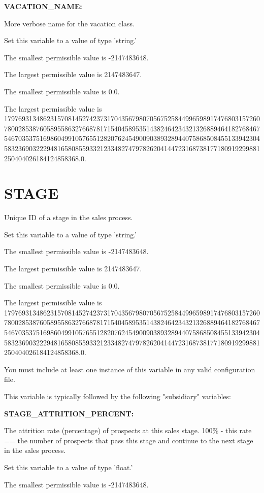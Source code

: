 \textbf{VACATION\_NAME:}


More verbose name for the vacation class.

Set this variable to a value of type 'string.'

The smallest permissible value is -2147483648.

The largest permissible value is 2147483647.

The smallest permissible value is 0.0.

The largest permissible value is 179769313486231570814527423731704356798070567525844996598917476803157260780028538760589558632766878171540458953514382464234321326889464182768467546703537516986049910576551282076245490090389328944075868508455133942304583236903222948165808559332123348274797826204144723168738177180919299881250404026184124858368.0.


\section{STAGE}


Unique ID of a stage in the sales process.

Set this variable to a value of type 'string.'

The smallest permissible value is -2147483648.

The largest permissible value is 2147483647.

The smallest permissible value is 0.0.

The largest permissible value is 179769313486231570814527423731704356798070567525844996598917476803157260780028538760589558632766878171540458953514382464234321326889464182768467546703537516986049910576551282076245490090389328944075868508455133942304583236903222948165808559332123348274797826204144723168738177180919299881250404026184124858368.0.

You must include at least one instance of this variable in any valid configuration file.

This variable is typically followed by the following "subsidiary" variables:


\textbf{STAGE\_ATTRITION\_PERCENT:}


The attrition rate (percentage) of prospects at this sales stage.  100\% - this rate == the number of prospects that pass this stage and continue to the next stage in the sales process.

Set this variable to a value of type 'float.'

The smallest permissible value is -2147483648.

